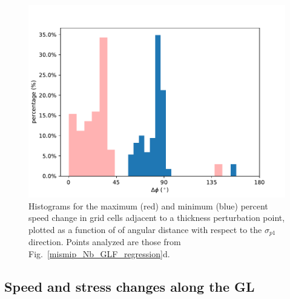 \documentclass[review,oneside]{igs}
\begin{document}
\begin{figure}
	\centering
    \includegraphics[width=1\linewidth]{figs/perturb_theta_velchange.pdf}
    \caption{Histograms for the maximum (red) and minimum (blue) percent speed change in grid cells adjacent to a thickness perturbation point, plotted as a function of of angular distance with respect to the $\sigma_{p1}$ direction. Points analyzed are those from Fig.~\ref{mismip_Nb_GLF_regression}d.}
	\label{perturb_theta_velchange}
\end{figure}

\subsection{Speed and stress changes along the GL}
\end{document}
